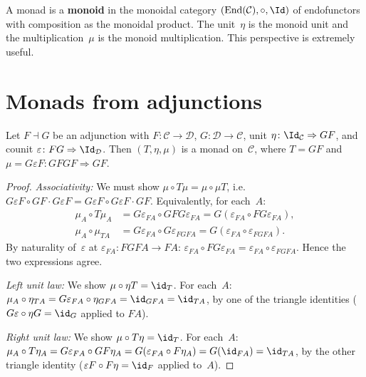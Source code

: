 \begin{remark}\label{rem:monad-as-monoid}
A monad is a \textbf{monoid} in the monoidal category
$(\mathrm{End}(\mathcal{C}),\circ,\Id)$ of endofunctors with
composition as the monoidal product.  The unit~$\eta$ is the monoid
unit and the multiplication~$\mu$ is the monoid multiplication.
This perspective is extremely useful.
\end{remark}


\section{Monads from adjunctions}\label{sec:monad-adj}

\begin{proposition}%
\label{prop:adj-monad}
Let $F\dashv G$ be an adjunction with
$F\colon\mathcal{C}\to\mathcal{D}$, $G\colon\mathcal{D}\to\mathcal{C}$,
unit $\eta\colon\Id_{\mathcal{C}}\Rightarrow GF$, and counit
$\varepsilon\colon FG\Rightarrow\Id_{\mathcal{D}}$.
Then $(T,\eta,\mu)$ is a monad on~$\mathcal{C}$, where $T = GF$ and
$\mu = G\varepsilon F\colon GFGF\Rightarrow GF$.
\end{proposition}

\begin{proof}
\textit{Associativity:}
We must show $\mu\circ T\mu = \mu\circ\mu T$, i.e.\
$G\varepsilon F\circ GF\cdot G\varepsilon F
= G\varepsilon F\circ G\varepsilon F\cdot GF$.
Equivalently, for each~$A$:
\begin{align*}
    \mu_A \circ T\mu_A
    &= G\varepsilon_{FA}\circ GFG\varepsilon_{FA}
    = G(\varepsilon_{FA}\circ FG\varepsilon_{FA}), \\
    \mu_A \circ \mu_{TA}
    &= G\varepsilon_{FA}\circ G\varepsilon_{FGF A}
    = G(\varepsilon_{FA}\circ\varepsilon_{FGFA}).
\end{align*}
By naturality of~$\varepsilon$ at $\varepsilon_{FA}\colon FGFA\to FA$:
$\varepsilon_{FA}\circ FG\varepsilon_{FA} = \varepsilon_{FA}\circ\varepsilon_{FGFA}$.
Hence the two expressions agree.

\textit{Left unit law:} We show $\mu\circ\eta T = \id_T$.
For each~$A$:
$\mu_A\circ\eta_{TA} = G\varepsilon_{FA}\circ\eta_{GFA}
= \id_{GFA} = \id_{TA}$,
by one of the triangle identities ($G\varepsilon\circ\eta G = \id_G$
applied to $FA$).

\textit{Right unit law:} We show $\mu\circ T\eta = \id_T$.
For each~$A$:
$\mu_A\circ T\eta_A = G\varepsilon_{FA}\circ GF\eta_A
= G(\varepsilon_{FA}\circ F\eta_A) = G(\id_{FA}) = \id_{TA}$,
by the other triangle identity ($\varepsilon F\circ F\eta = \id_F$
applied to~$A$).
\end{proof}

